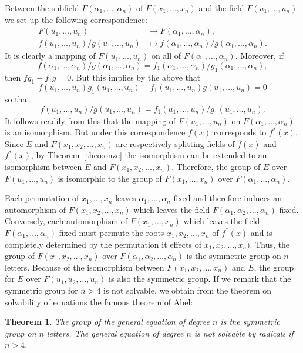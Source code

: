 \documentclass[10pt,leqno,a5paper]{book}
\newtheorem{theo}{Theorem}
\theoremstyle{definition}
\begin{document}
Between the subfield $F(\alpha_1, \ldots, \alpha_n)$ of $F(x_1, \ldots, x_n)$ and the field $F(u_1, \ldots, u_n)$ we set up the following correspondence:
\begin{align*}
F(u_1, \ldots, u_n) &\to F(\alpha_1, \ldots, \alpha_n),
\\
f(u_1, \ldots, u_n) / g(u_1, \ldots, u_n)
&\mapsto f(\alpha_1, \ldots, \alpha_n) / g(\alpha_1, \ldots, \alpha_n).
\end{align*}
It is clearly a mapping of $F(u_1, \ldots, u_n)$ on all of $F(\alpha_1, \ldots, \alpha_n)$.
Moreover, if
\[
f(\alpha_1, \ldots, \alpha_n) / g(\alpha_1, \ldots, \alpha_n)
= f_1(\alpha_1, \ldots, \alpha_n) / g_1(\alpha_1, \ldots, \alpha_n),
\]
then $f g_1 - f_1 g = 0$.
But this implies by the above that
\[
f(u_1, \ldots, u_n) g_1(u_1, \ldots, u_n)
- f_1(u_1, \ldots, u_n) g(u_1, \ldots, u_n) = 0
\]
so that
\[
f(u_1, \ldots, u_n) / g(u_1, \ldots, u_n)
= f_1(u_1, \ldots, u_n) / g_1(u_1, \ldots, u_n).
\]
It follows readily from this that the mapping of $F(u_1,\ldots,u_n)$ on $F(\alpha_1,\ldots,\alpha_n)$ is an isomorphism.
But under this correspondence $f(x)$ corresponds to $f^*(x)$.
Since $E$ and $F(x_1,x_2,\ldots,x_n)$ are respectively splitting fields of $f(x)$ and $f^*(x)$, by Theorem~\ref{theo:onze} the isomorphism can be extended to an isomorphism between $E$ and $F(x_1,x_2,\ldots,x_n)$.
Therefore, the group of $E$ over $F(u_1,\ldots,u_n)$ is isomorphic to the group of $F(x_1,\ldots,x_n)$ over $F(\alpha_1,\ldots,\alpha_n)$.

Each permutation of $x_1,\ldots,x_n$ leaves $\alpha_1,\ldots,\alpha_n$ fixed and therefore induces an automorphism of $F(x_1,x_2,\ldots,x_n)$ which leaves the field $F(\alpha_1,\alpha_2,\ldots,\alpha_n)$ fixed.
Conversely, each automorphism of $F(x_1,\ldots,x_n)$ which leaves the field $F(\alpha_1,\ldots,\alpha_n)$ fixed must permute the roots $x_1,x_2,\ldots,x_n$ of $f^*(x)$ and is completely determined by the permutation it effects of $x_1,x_2,\ldots,x_n)$.
Thus, the group of $F(x_1,x_2,\ldots,x_n)$ over $F(\alpha_1,\alpha_2,\ldots,\alpha_n)$ is the symmetric group on $n$ letters.
Because of the isomorphism between $F(x_1,x_2,\ldots,x_n)$ and $E$, the group for $E$ over $F(u_1,u_2,\ldots,u_n)$ is also the symmetric group.
If we remark that the symmetric group for $n > 4$ is not solvable, we obtain from the theorem on solvability of equations the famous theorem of Abel:

\begin{theo}
\label{theo:III.6}
The group of the general equation of degree $n$ is the symmetric group on $n$ letters.
The general equation of degree $n$ is not solvable by radicals if $n > 4$.
\end{theo}
\end{document}
